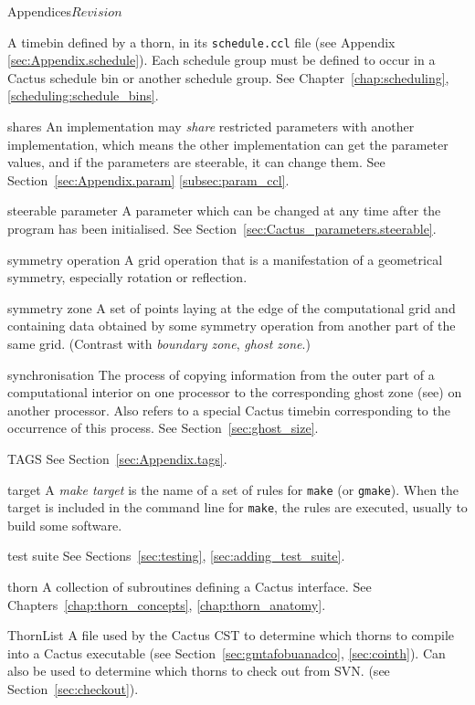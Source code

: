 \begin{cactuspart}{Appendices}{}{$Revision$}
\begin{Lentry}
  A timebin defined by a thorn, in its {\tt schedule.ccl} file (see
  Appendix \ref{sec:Appendix.schedule}).
  Each schedule group must be defined to occur in a Cactus schedule bin or
  another schedule group.  
  See Chapter~\ref{chap:scheduling}, \ref{scheduling:schedule_bins}.
\item[shares] An implementation may \textit{share} restricted parameters
  with another implementation, which means the other implementation can
  get the parameter values, and if the parameters are steerable, it can
  change them.
  See Section~\ref{sec:Appendix.param} \ref{subsec:param_ccl}.
\item[steerable parameter]
  A parameter which can be changed at any time after the program has been
  initialised.  See Section~\ref{sec:Cactus_parameters.steerable}.
\item[symmetry operation]
  A grid operation that is a manifestation of a geometrical symmetry,
  especially rotation or reflection.
\item[symmetry zone]
  A set of points laying at the edge of the computational grid and
  containing data obtained by some symmetry operation from
  another part of the same grid.
  (Contrast with \textit{boundary zone}, \textit{ghost zone}.)
\item[synchronisation]
  The process of copying information from the outer part of a 
  computational interior on one processor to the corresponding ghost zone 
  (see) on another processor.  Also refers to a special Cactus timebin
  corresponding to the occurrence of this process. 
  See Section~\ref{sec:ghost_size}.
\item[TAGS]
  See Section~\ref{sec:Appendix.tags}.
\item[target]
  A \textit{make target} is the name of a set of rules for 
  \texttt{make} (or \texttt{gmake}).  When the target is included in the
  command line for \texttt{make}, the rules are executed, usually to
  build some software.
\item[test suite]
  See Sections~\ref{sec:testing}, \ref{sec:adding_test_suite}.
\item[thorn]
  A collection of subroutines defining a Cactus interface.  
  See Chapters~\ref{chap:thorn_concepts}, \ref{chap:thorn_anatomy}.
\item[ThornList]
  A file used by the Cactus CST to determine which thorns to compile 
  into a Cactus executable
  (see Section~\ref{sec:gmtafobuanadco}, \ref{sec:cointh}). 
  Can also be used to determine which thorns
  to check out from SVN. (see Section~\ref{sec:checkout}).

\end{Lentry}
\end{cactuspart}
